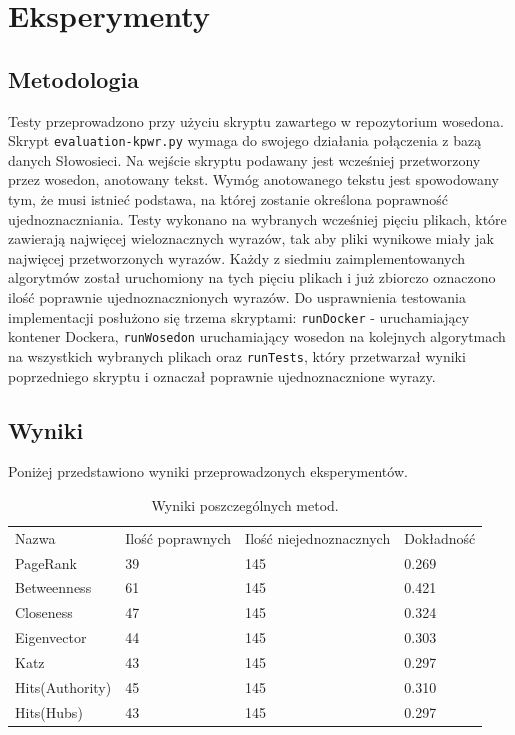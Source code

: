 \chapter{Eksperymenty}
\section{Metodologia}
Testy przeprowadzono przy użyciu skryptu zawartego w repozytorium wosedona. Skrypt \verb|evaluation-kpwr.py| wymaga do swojego działania połączenia z bazą danych Słowosieci. Na wejście skryptu podawany jest wcześniej przetworzony przez wosedon, anotowany tekst. Wymóg anotowanego tekstu jest spowodowany tym, że musi istnieć podstawa, na której zostanie określona poprawność ujednoznaczniania. Testy wykonano na wybranych wcześniej pięciu plikach, które zawierają najwięcej wieloznacznych wyrazów, tak aby pliki wynikowe miały jak najwięcej przetworzonych wyrazów. Każdy z siedmiu zaimplementowanych algorytmów został uruchomiony na tych pięciu plikach i już zbiorczo oznaczono ilość poprawnie ujednoznacznionych wyrazów. Do usprawnienia testowania implementacji posłużono się trzema skryptami: \verb|runDocker| - uruchamiający kontener Dockera, \verb|runWosedon| uruchamiający wosedon na kolejnych algorytmach na wszystkich wybranych plikach oraz \verb|runTests|, który przetwarzał wyniki poprzedniego skryptu i oznaczał poprawnie ujednoznacznione wyrazy.
\section{Wyniki}
Poniżej przedstawiono wyniki przeprowadzonych eksperymentów. 

\begin{table}[H]
\centering
\caption{Wyniki poszczególnych metod.}
\label{my-label}
\begin{tabular}{llll}
Nazwa           & Ilość poprawnych & Ilość niejednoznacznych & Dokładność \\
PageRank        & 39               & 145                     & 0.269      \\
Betweenness     & 61               & 145                     & 0.421      \\
Closeness       & 47               & 145                     & 0.324      \\
Eigenvector     & 44               & 145                     & 0.303      \\
Katz            & 43               & 145                     & 0.297      \\
Hits(Authority) & 45               & 145                     & 0.310      \\
Hits(Hubs)      & 43               & 145                     & 0.297     
\end{tabular}
\end{table}


